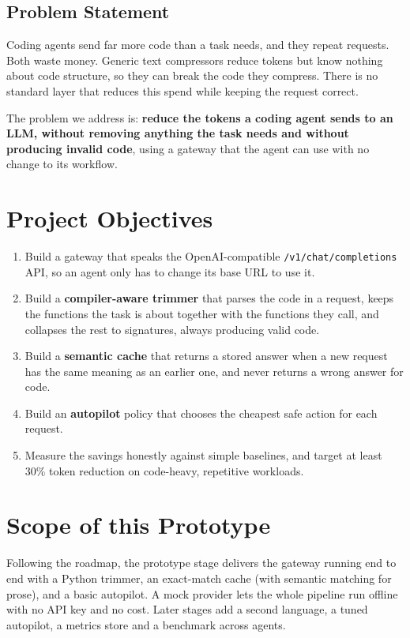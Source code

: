 \documentclass[12pt, a4paper, oneside]{report}
\newcommand{\code}[1]{\texttt{#1}}
\begin{document}
\subsection{Problem Statement}

Coding agents send far more code than a task needs, and they repeat requests. Both
waste money. Generic text compressors reduce tokens but know nothing about code
structure, so they can break the code they compress. There is no standard layer
that reduces this spend while keeping the request correct.

The problem we address is: \textbf{reduce the tokens a coding agent sends to an
LLM, without removing anything the task needs and without producing invalid
code}, using a gateway that the agent can use with no change to its workflow.

\section{Project Objectives}

\begin{enumerate}
    \item Build a gateway that speaks the OpenAI-compatible
          \code{/v1/chat/completions} API, so an agent only has to change its base
          URL to use it.
    \item Build a \textbf{compiler-aware trimmer} that parses the code in a request,
          keeps the functions the task is about together with the functions they
          call, and collapses the rest to signatures, always producing valid code.
    \item Build a \textbf{semantic cache} that returns a stored answer when a new
          request has the same meaning as an earlier one, and never returns a wrong
          answer for code.
    \item Build an \textbf{autopilot} policy that chooses the cheapest safe action
          for each request.
    \item Measure the savings honestly against simple baselines, and target at
          least 30\% token reduction on code-heavy, repetitive workloads.
\end{enumerate}

\section{Scope of this Prototype}

Following the roadmap, the prototype stage delivers the gateway running end to end
with a Python trimmer, an exact-match cache (with semantic matching for prose), and
a basic autopilot. A mock provider lets the whole pipeline run offline with no API
key and no cost. Later stages add a second language, a tuned autopilot, a metrics
store and a benchmark across agents.
\end{document}
